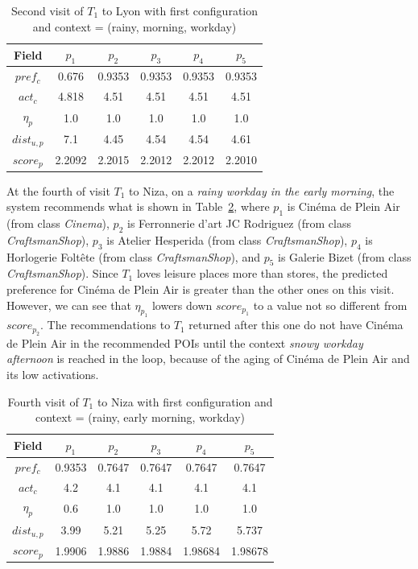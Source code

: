 \begin{table}[h!]
    \centering
        \caption{Second visit of $T_1$ to Lyon with first configuration and context = (rainy, morning, workday)}
    \label{table:t1-3}
    \begin{tabular}{ |c|c|c|c|c|c| } 
        \hline
        Field   & $p_1$ & $p_2$ & $p_3$ & $p_4$ & $p_5$ \\
        \hline
        $pref_c$    & 0.676 & 0.9353 & 0.9353 & 0.9353 & 0.9353 \\
        $act_c$     & 4.818 & 4.51 & 4.51 & 4.51 & 4.51 \\
        $\eta_p$    & 1.0 & 1.0 & 1.0 & 1.0 & 1.0 \\
        $dist_{u,p}$ & 7.1 & 4.45 & 4.54 & 4.54 & 4.61 \\
        $score_p$    & 2.2092 & 2.2015 & 2.2012 & 2.2012 & 2.2010 \\
        
        \hline
    \end{tabular}
\end{table}


At the fourth of  visit  $T_1$ to Niza, on a {\it rainy workday in the early morning}, the system recommends what is shown in Table~\ref{table:t1-2}, where $p_1$ is Cinéma de Plein Air (from class \textit{Cinema}), $p_2$ is Ferronnerie d'art JC Rodriguez (from class \textit{CraftsmanShop}), $p_3$ is Atelier Hesperida (from class \textit{CraftsmanShop}), $p_4$ is Horlogerie Foltête	(from class \textit{CraftsmanShop}), and $p_5$ is Galerie Bizet (from class \textit{CraftsmanShop}). Since $T_1$ loves leisure places more than stores, the predicted preference for Cinéma de Plein Air is greater than the other ones on this visit. However, we can see that $\eta_{p_1}$ lowers down $score_{p_1}$ to a value not so different from $score_{p_2}$. 
The recommendations to $T_1$ returned after this one do not have Cinéma de Plein Air in the recommended POIs until the context {\it snowy workday afternoon} is reached in the loop, because of the aging of Cinéma de Plein Air and its low activations.

\begin{table}[h!]
    \centering
    \caption{Fourth visit of $T_1$ to Niza with first configuration and context = (rainy, early morning, workday)}
    \label{table:t1-2}
    \begin{tabular}{ |c|c|c|c|c|c| } 
        \hline
        Field   & $p_1$ & $p_2$ & $p_3$ & $p_4$ & $p_5$ \\
        \hline
        $pref_c$    &  0.9353 & 0.7647 & 0.7647 & 0.7647 & 0.7647 \\
        $act_c$     & 4.2 & 4.1 & 4.1 & 4.1 & 4.1 \\
        $\eta_p$    & 0.6 & 1.0 & 1.0 & 1.0 & 1.0 \\
        $dist_{u,p}$ & 3.99 & 5.21 & 5.25 & 5.72 & 5.737 \\
        $score_p$    & 1.9906 & 1.9886 & 1.9884 & 1.98684 & 1.98678 \\
        \hline
    \end{tabular}
\end{table}

